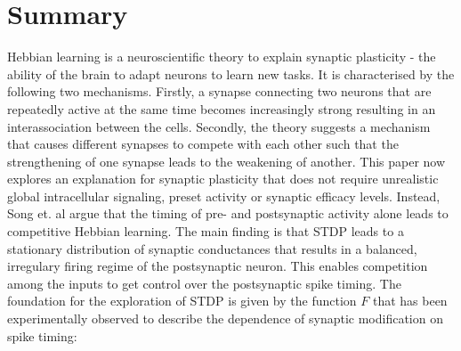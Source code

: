 \section{Summary}
Hebbian learning is a neuroscientific theory to explain synaptic plasticity - the ability of the brain to adapt neurons to learn new tasks. It is characterised by the following two mechanisms. Firstly, a synapse connecting two neurons that are repeatedly active at the same time becomes increasingly strong resulting in an interassociation between the cells. Secondly, the theory suggests a mechanism that causes different synapses to compete with each other such that the strengthening of one synapse leads to the weakening of another. 
This paper now explores an explanation for synaptic plasticity that does not require unrealistic global intracellular signaling, preset activity or synaptic efficacy levels. Instead, Song et. al argue that the timing of pre- and postsynaptic activity alone leads to competitive Hebbian learning. The main finding is that STDP leads to a stationary distribution of synaptic conductances that results in a balanced, irregulary firing regime of the postsynaptic neuron. This enables competition among the inputs to get control over the postsynaptic spike timing.
\newline\newline
The foundation for the exploration of STDP is given by the function $F$ that has been experimentally observed to describe the dependence of synaptic modification on spike timing:

